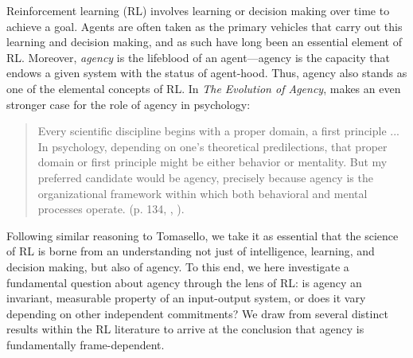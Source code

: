 \documentclass[11pt]{article} %
\begin{document}
%
Reinforcement learning (RL) involves learning or decision making over time to achieve a goal. Agents are often taken as the primary vehicles that carry out this learning and decision making, and as such have long been an essential element of RL. Moreover, \textit{agency} is the lifeblood of an agent---agency is the capacity that endows a given system with the status of agent-hood. Thus, agency also stands as one of the elemental concepts of RL. 
%
In \textit{The Evolution of Agency}, \citet{tomasello2022evolution} makes an even stronger case for the role of agency in psychology:
\begin{quote}
    Every scientific discipline begins with a proper domain, a first principle ... In psychology, depending on one’s theoretical predilections, that proper domain or first principle might be either behavior or mentality. But my preferred candidate would be agency, precisely because agency is the organizational framework within which both behavioral and mental processes operate.  (p. 134, \citeauthor{tomasello2022evolution}, \citeyear{tomasello2022evolution}).
\end{quote}
%
Following similar reasoning to Tomasello, we take it as essential that the science of RL is borne from an understanding not just of intelligence, learning, and decision making, but also of agency. To this end, we here investigate a fundamental question about agency through the lens of RL: is agency an invariant, measurable property of an input-output system, or does it vary depending on other independent commitments? We draw from several distinct results within the RL literature to arrive at the conclusion that agency is fundamentally frame-dependent. 
\end{document}
